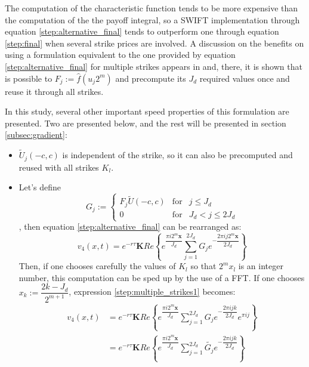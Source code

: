 \documentclass[12,twoside]{mammeTFM}
\theoremstyle{definition}
\theoremstyle{remark}
\begin{document}
The computation of the characteristic function tends to be more expensive than the computation of the the payoff integral, so a SWIFT implementation through equation \ref{step:alternative_final} tends to outperform one through equation \ref{step:final} when several strike prices are involved. A discussion on the benefits on using a formulation equivalent to the one provided by equation \ref{step:alternative_final} for multiple strikes appears in \cite{Ortiz-Gracia2016} and, there, it is shown that is possible to $F_j := \hat{f}(u_j 2^m)$ and precompute its $J_d$ required values once and reuse it through all strikes.

In this study, several other important speed properties of this formulation are presented. Two are presented below, and the rest will be presented in section \ref{subsec:gradient}:
\begin{itemize}
\item $\tilde{U}_j(-c, c)$ is independent of the strike, so it can also be precomputed and reused with all strikes $K_l$.
\item Let's define
\begin{equation} 
G_j := \left\{ \begin{array}{rcl} F_j \tilde{U}(-c, c) & \mbox{for} & j \leq J_d \\
 0 & \mbox{for} & J_d < j \leq 2 J_d \end{array}\right.
\end{equation}
, then equation \ref{step:alternative_final} can be rearranged as:
\begin{equation}\label{step:multiple_strikes1}
v_4(x, t) = e^{-r\tau}\boldsymbol{K} Re \left\{e^{\dfrac{\pi i 2^m \boldsymbol{x}}{J_d}} \sum_{j=1}^{2J_d} G_j e^{- \dfrac{2\pi i j 2^m \boldsymbol{x}}{2J_d}} \right\}
\end{equation}
Then, if one chooses carefully the values of $K_l$ so that $2^m x_l$ is an integer number, this computation can be sped up by the use of a FFT. If one chooses $x_k := \dfrac{2k - J_d}{2^{m+1}}$, expression \ref{step:multiple_strikes1} becomes:
\begin{equation}\label{step:multiple_strikes2}
\begin{aligned}
v_4(x, t) & = e^{-r\tau}\boldsymbol{K} Re \left\{e^{\dfrac{\pi i 2^m \boldsymbol{x}}{J_d}} \sum_{j=1}^{2J_d} G_j e^{- \dfrac{2\pi i j k}{2J_d}} e^{\pi i j}  \right\} \\
& = e^{-r\tau}\boldsymbol{K} Re \left\{e^{\dfrac{\pi i 2^m \boldsymbol{x}}{J_d}} \sum_{j=1}^{2J_d} \tilde{G_j} e^{- \dfrac{2\pi i j k}{2J_d}} \right\} \\

\end{aligned}
\end{equation}
\end{itemize}
\end{document}
